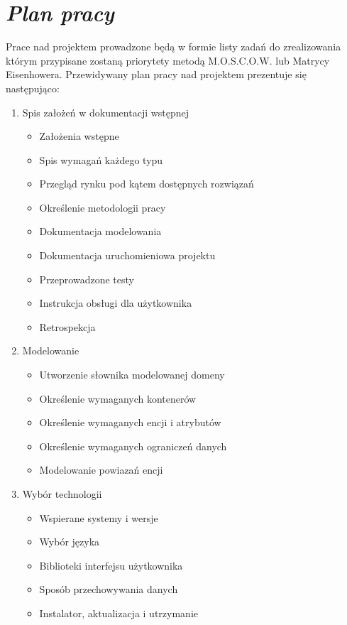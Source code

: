 \documentclass[a4paper,12pt]{report}
\newcommand{\customstylechapter}[1]{\large{\textit{#1}}}
\begin{document}
\chapter{\customstylechapter{Plan pracy}}
Prace nad projektem prowadzone będą w formie listy zadań do zrealizowania 
którym przypisane zostaną priorytety metodą M.O.S.C.O.W. lub Matrycy 
Eisenhowera. Przewidywany plan pracy nad projektem prezentuje się następująco:
\begin{enumerate}
    \item Spis założeń w dokumentacji wstępnej
    \begin{itemize}
        \item Założenia wstępne
        \item Spis wymagań każdego typu
        \item Przegląd rynku pod kątem dostępnych rozwiązań
        \item Określenie metodologii pracy
        \item Dokumentacja modelowania
        \item Dokumentacja uruchomieniowa projektu
        \item Przeprowadzone testy
        \item Instrukcja obsługi dla użytkownika
        \item Retrospekcja
    \end{itemize}
    \item Modelowanie 
    \begin{itemize}
        \item Utworzenie słownika modelowanej domeny
        \item Określenie wymaganych kontenerów
        \item Określenie wymaganych encji i atrybutów
        \item Określenie wymaganych ograniczeń danych
        \item Modelowanie powiazań encji
    \end{itemize}
    \item Wybór technologii
    \begin{itemize}
        \item Wspierane systemy i wersje
        \item Wybór języka
        \item Biblioteki interfejsu użytkownika
        \item Sposób przechowywania danych
        \item Instalator, aktualizacja i utrzymanie 

\end{itemize}
\end{enumerate}
\end{document}
